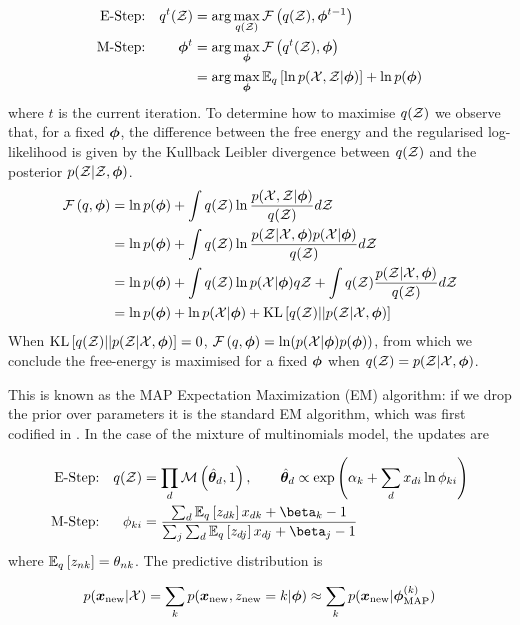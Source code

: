 \begin{align*}
\text{E-Step:} & & q^t(\zdat) & = \arg \max_{q(\zdat)} \fqt{q(\zdat), \param^{t-1}} \\
\text{M-Step:} & & \param^t & = \arg \max_{\param} \fqt{q^t(\zdat), \param} \\
& & & = \arg \max_{\param} \exlogjoint{q} + \ln p(\param)
\end{align*}
where $t$ is the current iteration. To determine how to maximise $q(\zdat)$ we observe that, for a fixed $\param$, the difference between the free energy and the regularised log-likelihood is given by the Kullback Leibler divergence between $q(\zdat)$ and the posterior $p(\zdat|\zdat, \param)$.
\begin{align*}
\fqt{q, \param} 
& = \ln p(\param) + \int q(\zdat) \ln \frac{p(\xdat, \zdat|\param)}{q(\zdat)} d\zdat \\
& = \ln p(\param) + \int q(\zdat) \ln \frac{p(\zdat|\xdat, \param)p(\xdat | \param)}{q(\zdat)} d\zdat \\
& = \ln p(\param) + \int q(\zdat) \ln p(\xdat | \param) q\zdat + \int q(\zdat)\frac{p(\zdat|\xdat, \param)}{q(\zdat)} d\zdat \\
& = \ln p(\param) + \ln p(\xdat | \param) + \kl{q(\zdat)}{p(\zdat|\xdat, \param)}
\end{align*}
When $\kl{q(\zdat)}{p(\zdat|\xdat, \param)} = 0$, $\fqt{q, \param} = \ln(p(\xdat | \param)p(\param))$, from which we conclude the free-energy is maximised for a fixed $\param$ when $q(\zdat) = p(\zdat | \xdat, \param)$.

This is known as the MAP Expectation Maximization (EM) algorithm: if we drop the prior over parameters it is the standard EM algorithm, which was first codified in \cite{Dempster1977}. In the case of the mixture of multinomials model, the updates are

\begin{align*}
\text{E-Step:} & & q(\zdat) & = \prod_d \muln{\hat{\vv{\theta}}_d}{1}, \qquad
\hat{\vv{\theta}}_d \propto \exp\left( \alpha_k + \sum_d x_{di} \ln \phi_{ki} \right) \\
\text{M-Step:} & & \phi_{ki} & = \frac{\sum_d \ex{z_{dk}}{q} x_{dk} + \beta_k - 1}{\sum_j \sum_d \ex{z_{dj}}{q} x_{dj} + \beta_j - 1}
\end{align*}
where $\ex{z_{nk}}{q} = \theta_{nk}$. The predictive distribution is

\begin{align*}
p(\xnew | \xdat)  = \sum_k p(\xnew, z_{\text{new}} = k | \param) 
\approx \sum_k p(\xnew | \param^{(k)}_{\text{MAP}})
\end{align*}


